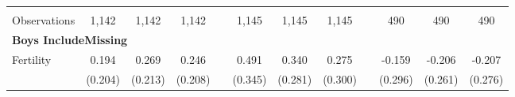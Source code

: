 \begin{landscape}
\begin{table}[htpb!]
\begin{center}
\begin{tabular}{lcccp{2mm}cccp{2mm}ccc}
\begin{footnotesize}\end{footnotesize}&\begin{footnotesize}\end{footnotesize}&\begin{footnotesize}\end{footnotesize}&\begin{footnotesize}\end{footnotesize}&\begin{footnotesize}\end{footnotesize}&\begin{footnotesize}\end{footnotesize}&\begin{footnotesize}\end{footnotesize}&\begin{footnotesize}\end{footnotesize}&\begin{footnotesize}\end{footnotesize}&\begin{footnotesize}\end{footnotesize}&\begin{footnotesize}\end{footnotesize}&\begin{footnotesize}\end{footnotesize}\\Observations&1,142&1,142&1,142&&1,145&1,145&1,145&&490&490&490\\
\multicolumn{12}{l}{\textbf{Boys IncludeMissing}}\\ 
Fertility&0.194&0.269&0.246&&0.491&0.340&0.275&&-0.159&-0.206&-0.207\\
&(0.204)&(0.213)&(0.208)&&(0.345)&(0.281)&(0.300)&&(0.296)&(0.261)&(0.276)\\

\end{tabular}
\end{center}
\end{table}
\end{landscape}
